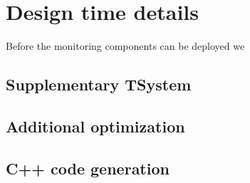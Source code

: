 \chapter{Design time details}

Before the monitoring components can be deployed we 

\section{Supplementary TSystem}


\section{Additional optimization}


\section{C++ code generation}


